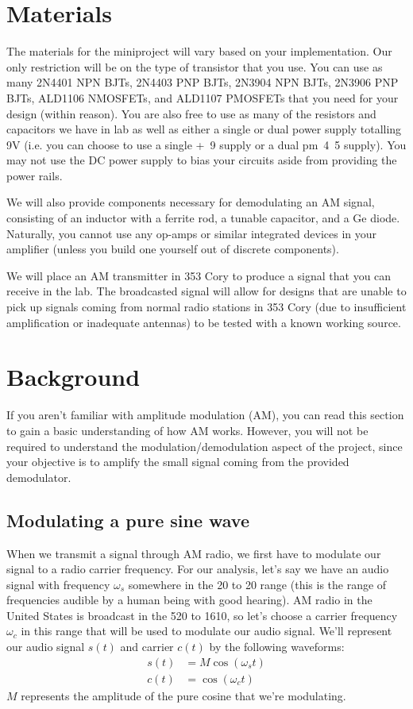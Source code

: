 \documentclass{article}
\begin{document}
\section{Materials}
The materials for the miniproject will vary based on your implementation. Our only restriction will be on the type of transistor that you use. You can use as many 2N4401 NPN BJTs, 2N4403 PNP BJTs, 2N3904 NPN BJTs, 2N3906 PNP BJTs, ALD1106 NMOSFETs, and ALD1107 PMOSFETs that you need for your design (within reason). You are also free to use as many of the resistors and capacitors we have in lab as well as either a single or dual power supply totalling \unit{9}{V} (i.e. you can choose to use a single \unit{+9}{\volt} supply or a dual \unit{\pm 4.5}{\volt} supply). You may not use the DC power supply to bias your circuits aside from providing the power rails.

We will also provide components necessary for demodulating an AM signal, consisting of an inductor with a ferrite rod, a tunable capacitor, and a Ge diode. Naturally, you cannot use any op-amps or similar integrated devices in your amplifier (unless you build one yourself out of discrete components).

We will place an AM transmitter in 353 Cory to produce a signal that you can receive in the lab. The broadcasted signal will allow for designs that are unable to pick up signals coming from normal radio stations in 353 Cory (due to insufficient amplification or inadequate antennas) to be tested with a known working source.

\section{Background}
If you aren't familiar with amplitude modulation (AM), you can read this section to gain a basic understanding of how AM works. However, you will not be required to understand the modulation/demodulation aspect of the project, since your objective is to amplify the small signal coming from the provided demodulator.

\subsection{Modulating a pure sine wave}
When we transmit a signal through AM radio, we first have to modulate our signal to a radio carrier frequency. For our analysis, let's say we have an audio signal with frequency $\omega_s$ somewhere in the \unit{20}{\hertz} to \unit{20}{\kilo\hertz} range (this is the range of frequencies audible by a human being with good hearing). AM radio in the United States is broadcast in the \unit{520}{\kilo\hertz} to \unit{1610}{\kilo\hertz}, so let's choose a carrier frequency $\omega_c$ in this range that will be used to modulate our audio signal. We'll represent our audio signal $s(t)$ and carrier $c(t)$ by the following waveforms:
\begin{align*}
  s(t) &= M \cos\left(\omega_s t\right) \\
  c(t) &= \cos\left(\omega_c t\right)
\end{align*}
$M$ represents the amplitude of the pure cosine that we're modulating.
\end{document}

